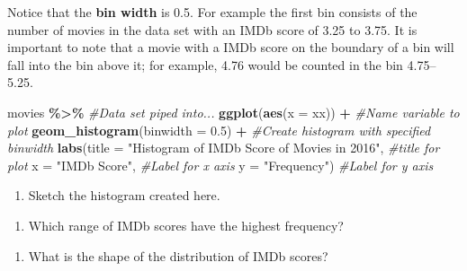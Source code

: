 \documentclass[
]{report}
\newenvironment{Shaded}{\begin{snugshade}}{\end{snugshade}}
\newcommand{\CommentTok}[1]{\textcolor[rgb]{0.56,0.35,0.01}{\textit{#1}}}
\newcommand{\DataTypeTok}[1]{\textcolor[rgb]{0.13,0.29,0.53}{#1}}
\newcommand{\FloatTok}[1]{\textcolor[rgb]{0.00,0.00,0.81}{#1}}
\newcommand{\KeywordTok}[1]{\textcolor[rgb]{0.13,0.29,0.53}{\textbf{#1}}}
\newcommand{\NormalTok}[1]{#1}
\newcommand{\OperatorTok}[1]{\textcolor[rgb]{0.81,0.36,0.00}{\textbf{#1}}}
\newcommand{\StringTok}[1]{\textcolor[rgb]{0.31,0.60,0.02}{#1}}
\providecommand{\tightlist}{%
  \setlength{\itemsep}{0pt}\setlength{\parskip}{0pt}}
\begin{document}
Notice that the \textbf{bin width} is 0.5. For example the first bin consists of the number of movies in the data set with an IMDb score of 3.25 to 3.75. It is important to note that a movie with a IMDb score on the boundary of a bin will fall into the bin above it; for example, 4.76 would be counted in the bin 4.75--5.25.

\begin{Shaded}
\begin{Highlighting}[]
\NormalTok{movies }\OperatorTok{\%\textgreater{}\%}\StringTok{ }\CommentTok{\#Data set piped into...}
\KeywordTok{ggplot}\NormalTok{(}\KeywordTok{aes}\NormalTok{(}\DataTypeTok{x =}\NormalTok{ xx)) }\OperatorTok{+}\StringTok{   }\CommentTok{\#Name variable to plot}
\StringTok{  }\KeywordTok{geom\_histogram}\NormalTok{(}\DataTypeTok{binwidth =} \FloatTok{0.5}\NormalTok{) }\OperatorTok{+}\StringTok{  }\CommentTok{\#Create histogram with specified binwidth}
\StringTok{  }\KeywordTok{labs}\NormalTok{(}\DataTypeTok{title =} \StringTok{"Histogram of IMDb Score of Movies in 2016"}\NormalTok{, }\CommentTok{\#title for plot}
       \DataTypeTok{x =} \StringTok{"IMDb Score"}\NormalTok{, }\CommentTok{\#Label for x axis}
       \DataTypeTok{y =} \StringTok{"Frequency"}\NormalTok{) }\CommentTok{\#Label for y axis}
\end{Highlighting}
\end{Shaded}

\begin{enumerate}
\def\labelenumi{\arabic{enumi}.}
\setcounter{enumi}{7}
\tightlist
\item
  Sketch the histogram created here.
\end{enumerate}

\vspace{1in}

\begin{enumerate}
\def\labelenumi{\arabic{enumi}.}
\setcounter{enumi}{8}
\tightlist
\item
  Which range of IMDb scores have the highest frequency?
\end{enumerate}

\vspace{0.4in}

\begin{enumerate}
\def\labelenumi{\arabic{enumi}.}
\setcounter{enumi}{9}
\tightlist
\item
  What is the shape of the distribution of IMDb scores?
\end{enumerate}

\vspace{0.4in}
\end{document}
